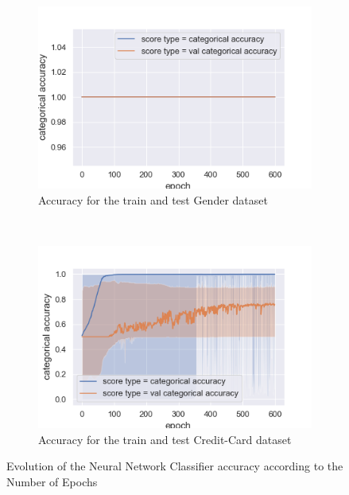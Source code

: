 \documentclass[10pt]{article}
\begin{document}
		\paragraph*{}
			\begin{figure}[h]
				\centering
				\begin{subfigure}[]{0.45\columnwidth}
					\centering
					\includegraphics[width=\linewidth]{../graphics/per_gender_epoch_score_type_score_type_full.png}
					\caption{Accuracy for the train and test Gender dataset}
					\label{nn:g_train_vs_test}
				\end{subfigure}
				~
				\begin{subfigure}[]{0.45\columnwidth}
					\centering
					\includegraphics[width=\linewidth]{../graphics/per_creditcard_epoch_score_type_score_type_full.png}
					\caption{Accuracy for the train and test Credit-Card dataset}
					\label{nn:cc_train_vs_test}
				\end{subfigure}
				\caption{Evolution of the Neural Network Classifier accuracy according to the Number of Epochs}
				\label{nn:train_vs_test}
			\end{figure}
\end{document}
